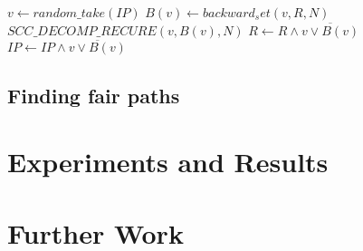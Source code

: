 \documentclass[11pt]{article}
\begin{document}
\begin{multicols}{2}
\begin{algorithm}[H]
                    \State $v \gets random\_take(IP)$
                    \State $B(v) \gets backward_set(v, R, N)$
                    \State $SCC\_DECOMP\_RECURE(v, B(v), N)$
                    \State $R \gets R \wedge \overline{v \vee B(v)}$
                    \State $IP \gets IP \wedge \overline {v \vee B(v)}$

            \EndProcedure
        \end{algorithm}
        \end{multicols}

    \subsection{Finding fair paths}


\section{Experiments and Results}

\section{Further Work}


\pagebreak


\end{document}
